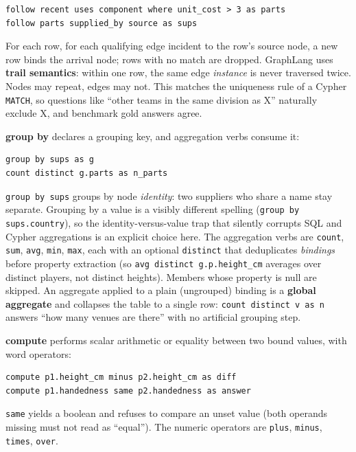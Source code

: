\documentclass[11pt]{article}
\begin{document}
\begin{lstlisting}[style=gl]
follow recent uses component where unit_cost > 3 as parts
follow parts supplied_by source as sups
\end{lstlisting}

For each row, for each qualifying edge incident to the row's source node, a new row binds the arrival node; rows with no match are dropped. GraphLang uses \textbf{trail semantics}: within one row, the same edge \emph{instance} is never traversed twice. Nodes may repeat, edges may not. This matches the uniqueness rule of a Cypher \texttt{MATCH}, so questions like ``other teams in the same division as X'' naturally exclude X, and benchmark gold answers agree.

\textbf{group by} declares a grouping key, and aggregation verbs consume it:

\begin{lstlisting}[style=gl]
group by sups as g
count distinct g.parts as n_parts
\end{lstlisting}

\texttt{group by sups} groups by node \emph{identity}: two suppliers who share a name stay separate. Grouping by a value is a visibly different spelling (\texttt{group by sups.country}), so the identity-versus-value trap that silently corrupts SQL and Cypher aggregations is an explicit choice here. The aggregation verbs are \texttt{count}, \texttt{sum}, \texttt{avg}, \texttt{min}, \texttt{max}, each with an optional \texttt{distinct} that deduplicates \emph{bindings} before property extraction (so \texttt{avg distinct g.p.height\_cm} averages over distinct players, not distinct heights). Members whose property is null are skipped. An aggregate applied to a plain (ungrouped) binding is a \textbf{global aggregate} and collapses the table to a single row: \texttt{count distinct v as n} answers ``how many venues are there'' with no artificial grouping step.

\textbf{compute} performs scalar arithmetic or equality between two bound values, with word operators:

\begin{lstlisting}[style=gl]
compute p1.height_cm minus p2.height_cm as diff
compute p1.handedness same p2.handedness as answer
\end{lstlisting}

\texttt{same} yields a boolean and refuses to compare an unset value (both operands missing must not read as ``equal''). The numeric operators are \texttt{plus}, \texttt{minus}, \texttt{times}, \texttt{over}.
\end{document}

